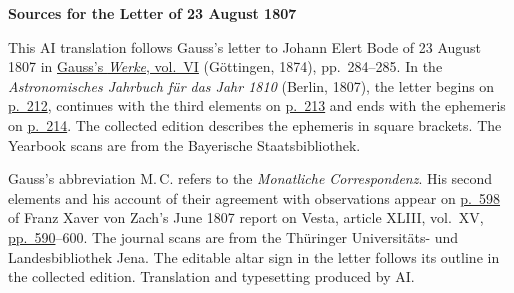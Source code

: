 \clearpage\thispagestyle{empty}
\begin{center}\textbf{Sources for the Letter of 23 August 1807}\end{center}
\noindent This AI translation follows Gauss’s letter to Johann Elert Bode of 23 August 1807 in \href{https://gdz.sub.uni-goettingen.de/id/PPN236007467}{Gauss’s \textit{Werke}, vol.~VI} (Göttingen, 1874), pp.~284--285. In the \textit{Astronomisches Jahrbuch für das Jahr 1810} (Berlin, 1807), the letter begins on \href{https://www.digitale-sammlungen.de/en/view/bsb10538339?page=222}{p.~212}, continues with the third elements on \href{https://www.digitale-sammlungen.de/en/view/bsb10538339?page=223}{p.~213} and ends with the ephemeris on \href{https://www.digitale-sammlungen.de/en/view/bsb10538339?page=224}{p.~214}. The collected edition describes the ephemeris in square brackets. The Yearbook scans are from the Bayerische Staatsbibliothek.
\par\medskip
Gauss’s abbreviation M.\,C. refers to the \textit{Monatliche Correspondenz}. His second elements and his account of their agreement with observations appear on \href{https://zs.thulb.uni-jena.de/rsc/viewer/jportal_derivate_00237836/Monatliche_Correspondenz_130168688_15_1807_0605.tif}{p.~598} of Franz Xaver von Zach’s June 1807 report on Vesta, article XLIII, vol.~XV, \href{https://zs.thulb.uni-jena.de/rsc/viewer/jportal_derivate_00237836/Monatliche_Correspondenz_130168688_15_1807_0597.tif}{pp.~590}--600. The journal scans are from the Thüringer Universitäts- und Landesbibliothek Jena. The editable altar sign in the letter follows its outline in the collected edition. Translation and typesetting produced by AI.
\clearpage
